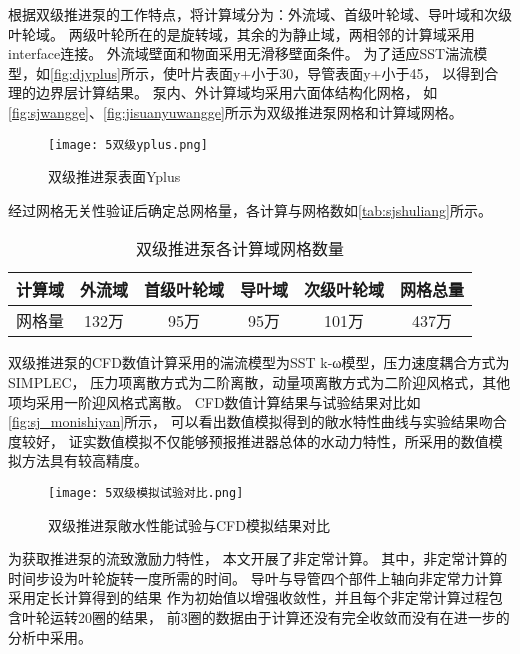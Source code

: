 根据双级推进泵的工作特点，将计算域分为：外流域、首级叶轮域、导叶域和次级叶轮域。
两级叶轮所在的是旋转域，其余的为静止域，两相邻的计算域采用interface连接。
外流域壁面和物面采用无滑移壁面条件。
为了适应SST湍流模型，如\autoref{fig:djyplus}所示，使叶片表面y+小于30，导管表面y+小于45，
以得到合理的边界层计算结果。
泵内、外计算域均采用六面体结构化网格，
如\autoref{fig:sjwangge}、\autoref{fig:jisuanyuwangge}所示为双级推进泵网格和计算域网格。
\begin{figure}[htbp]
    \centering
    \texttt{[image: 5双级yplus.png]}
    \caption{\label{fig:djyplus}双级推进泵表面Yplus}
\end{figure}

经过网格无关性验证后确定总网格量，各计算与网格数如\autoref{tab:sjshuliang}所示。
\begin{table}[htbp]
    \centering
    \caption{\label{tab:sjshuliang}双级推进泵各计算域网格数量}
    \begin{tabular}{cccccc}
        \toprule
        计算域 & 外流域 & 首级叶轮域 & 导叶域 & 次级叶轮域 & 网格总量 \\
        \midrule
        网格量 & 132万 & 95万 & 95万 & 101万 & 437万 \\
        \bottomrule
    \end{tabular}
\end{table}

双级推进泵的CFD数值计算采用的湍流模型为SST k-ω模型，压力速度耦合方式为SIMPLEC，
压力项离散方式为二阶离散，动量项离散方式为二阶迎风格式，其他项均采用一阶迎风格式离散。
CFD数值计算结果与试验结果对比如\autoref{fig:sj_monishiyan}所示，
可以看出数值模拟得到的敞水特性曲线与实验结果吻合度较好，
证实数值模拟不仅能够预报推进器总体的水动力特性，所采用的数值模拟方法具有较高精度。
\begin{figure}[htbp]
    \centering
    \texttt{[image: 5双级模拟试验对比.png]}
    \caption{\label{fig:sj_monishiyan}双级推进泵敞水性能试验与CFD模拟结果对比}
\end{figure}

为获取推进泵的流致激励力特性，
本文开展了非定常计算。
其中，非定常计算的时间步设为叶轮旋转一度所需的时间。
导叶与导管四个部件上轴向非定常力计算采用定长计算得到的结果
作为初始值以增强收敛性，并且每个非定常计算过程包含叶轮运转20圈的结果，
前3圈的数据由于计算还没有完全收敛而没有在进一步的分析中采用。
